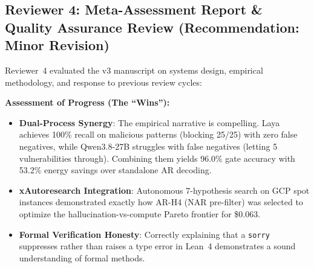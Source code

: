 \documentclass[conference]{IEEEtran}
\begin{document}
\subsection{Reviewer 4: Meta-Assessment Report \& Quality Assurance Review (Recommendation: Minor Revision)}
\label{subsec:rev4}

Reviewer~4 evaluated the v3 manuscript on systems design, empirical methodology, and response to previous review cycles:

\noindent\textbf{Assessment of Progress (The ``Wins''):}
\begin{itemize}
  \item \textbf{Dual-Process Synergy}: The empirical narrative is compelling. Laya achieves 100\% recall on malicious patterns (blocking 25/25) with zero false negatives, while Qwen3.8-27B struggles with false negatives (letting 5 vulnerabilities through). Combining them yields 96.0\% gate accuracy with 53.2\% energy savings over standalone AR decoding.
  \item \textbf{xAutoresearch Integration}: Autonomous 7-hypothesis search on GCP spot instances demonstrated exactly how AR-H4 (NAR pre-filter) was selected to optimize the hallucination-vs-compute Pareto frontier for \$0.063.
  \item \textbf{Formal Verification Honesty}: Correctly explaining that a \texttt{sorry} suppresses rather than raises a type error in Lean~4 demonstrates a sound understanding of formal methods.
\end{itemize}
\end{document}
